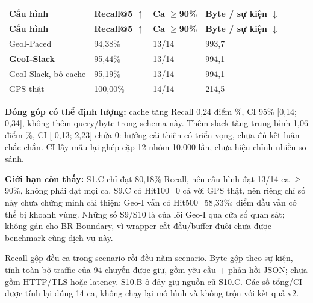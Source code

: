 \endgroup
\begingroup\small
\begin{longtable}{@{}P{4.839cm}P{3.581cm}P{3.194cm}P{4.742cm}@{}}
\toprule
\textbf{Cấu hình} & \textbf{Recall@5 $\uparrow$} & \textbf{Ca $\ge$90\%} & \textbf{Byte / sự kiện $\downarrow$}\\\midrule
\endfirsthead
\toprule
\textbf{Cấu hình} & \textbf{Recall@5 $\uparrow$} & \textbf{Ca $\ge$90\%} & \textbf{Byte / sự kiện $\downarrow$}\\\midrule
\endhead
\bottomrule\endfoot
GeoI-Paced & 94,38\% & 13/14 & 993,7\\
\addlinespace[3pt]
\textbf{GeoI-Slack} & 95,44\% & 13/14 & 994,1\\
\addlinespace[3pt]
GeoI-Slack, bỏ cache & 95,19\% & 13/14 & 994,1\\
\addlinespace[3pt]
GPS thật & 100,00\% & 14/14 & 214,5\\
\end{longtable}
\endgroup
\textbf{Đóng góp có thể định lượng:} cache tăng Recall 0,24 điểm \%, CI 95\% [0,14; 0,34], không thêm query/byte trong schema này. Thêm slack tăng trung bình 1,06 điểm \%, CI [-0,13; 2,23] chứa 0: hướng cải thiện có triển vọng, chưa đủ kết luận chắc chắn. CI lấy mẫu lại ghép cặp 12 nhóm 10.000 lần, chưa hiệu chỉnh nhiều so sánh.

\textbf{Giới hạn còn thấy:} S1.C chỉ đạt 80,18\% Recall, nên cấu hình đạt 13/14 ca $\ge$90\%, không phải đạt mọi ca. S9.C có Hit100=0 cả với GPS thật, nên riêng chỉ số này chưa chứng minh cải thiện; Geo-I vẫn có Hit500=58,33\%: điểm đầu vẫn có thể bị khoanh vùng. Những số S9/S10 là của lõi Geo-I qua cửa sổ quan sát; không gán cho BR-Boundary, vì wrapper cắt đầu/buffer đuôi chưa được benchmark cùng dịch vụ này.

Recall gộp đều ca trong scenario rồi đều năm scenario. Byte gộp theo sự kiện, tính toàn bộ traffic của 94 chuyến được giữ, gồm yêu cầu + phản hồi JSON; chưa gồm HTTP/TLS hoặc latency. S10.B ở đây giữ nguồn cũ S10.C. Các số tổng/CI được tính lại đúng 14 ca, không chạy lại mô hình và không trộn với kết quả v2.


